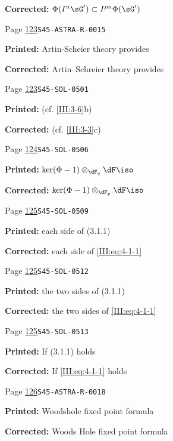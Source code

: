 \begin{description}
\par\noindent\textbf{Corrected:} \(\Phi(I^n \sG')\subset I^{p n}\Phi(\sG')\)
\smallskip
\item[\hypertarget{apparatus:EN-0057}{57}] Page \hyperlink{printpage:en:123}{123}\quad\texttt{S45-ASTRA-R-0015}
\par\noindent\textbf{Printed:} Artin-Scheier theory provides
\par\noindent\textbf{Corrected:} Artin--Schreier theory provides
\smallskip
\item[\hypertarget{apparatus:EN-0058}{58}] Page \hyperlink{printpage:en:123}{123}\quad\texttt{S45-SOL-0501}
\par\noindent\textbf{Printed:} (cf. \ref{III:3-6}b)
\par\noindent\textbf{Corrected:} (cf. \ref{III:3-3}c)
\smallskip
\item[\hypertarget{apparatus:EN-0059}{59}] Page \hyperlink{printpage:en:124}{124}\quad\texttt{S45-SOL-0506}
\par\noindent\textbf{Printed:} \(\ker(\Phi-1)\otimes_{\dF_q}\dF \iso\)
\par\noindent\textbf{Corrected:} \(\ker(\Phi-1)\otimes_{\dF_p}\dF \iso\)
\smallskip
\item[\hypertarget{apparatus:EN-0060}{60}] Page \hyperlink{printpage:en:125}{125}\quad\texttt{S45-SOL-0509}
\par\noindent\textbf{Printed:} each side of (3.1.1)
\par\noindent\textbf{Corrected:} each side of \eqref{III:eq:4-1-1}
\smallskip
\item[\hypertarget{apparatus:EN-0061}{61}] Page \hyperlink{printpage:en:125}{125}\quad\texttt{S45-SOL-0512}
\par\noindent\textbf{Printed:} the two sides of (3.1.1)
\par\noindent\textbf{Corrected:} the two sides of \eqref{III:eq:4-1-1}
\smallskip
\item[\hypertarget{apparatus:EN-0062}{62}] Page \hyperlink{printpage:en:125}{125}\quad\texttt{S45-SOL-0513}
\par\noindent\textbf{Printed:} If (3.1.1) holds
\par\noindent\textbf{Corrected:} If \eqref{III:eq:4-1-1} holds
\smallskip
\item[\hypertarget{apparatus:EN-0063}{63}] Page \hyperlink{printpage:en:126}{126}\quad\texttt{S45-ASTRA-R-0018}
\par\noindent\textbf{Printed:} Woodshole fixed point formula
\par\noindent\textbf{Corrected:} Woods Hole fixed point formula

\end{description}
